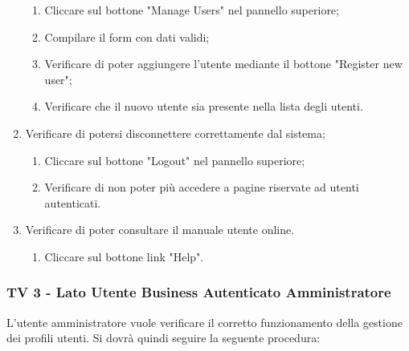 \begin{enumerate}
\begin{enumerate}
\item Cliccare sul bottone "Manage Users" nel pannello superiore;
\item Compilare il form con dati validi;
\item Verificare di poter aggiungere l'utente mediante il bottone "Register new user";
\item Verificare che il nuovo utente sia presente nella lista degli utenti. 
\end{enumerate}
\item Verificare di potersi disconnettere correttamente dal sistema;
\begin{enumerate}
\item Cliccare sul bottone "Logout" nel pannello superiore;
\item Verificare di non poter più accedere a pagine riservate ad utenti autenticati.
\end{enumerate}
\item Verificare di poter consultare il manuale utente online.
\begin{enumerate}
\item Cliccare sul bottone link "Help".
\end{enumerate}

\end{enumerate}

\subsubsection{TV 3 - Lato Utente Business Autenticato Amministratore}

L'utente amministratore vuole verificare il corretto funzionamento della gestione dei profili utenti.
Si dovrà quindi seguire la seguente procedura:

